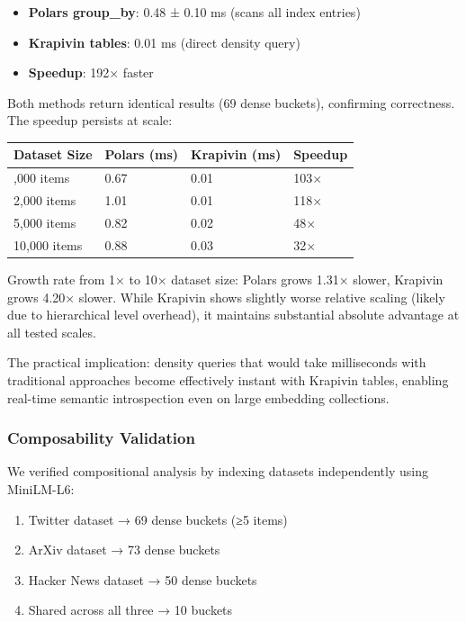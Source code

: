 \documentclass[
]{article}
\providecommand{\tightlist}{%
  \setlength{\itemsep}{0pt}\setlength{\parskip}{0pt}}
\begin{document}
\begin{itemize}
\tightlist
\item
  \textbf{Polars group\_by}: 0.48 ± 0.10 ms (scans all index entries)
\item
  \textbf{Krapivin tables}: 0.01 ms (direct density query)
\item
  \textbf{Speedup}: 192× faster
\end{itemize}

Both methods return identical results (69 dense buckets), confirming
correctness. The speedup persists at scale:

\begin{longtable}[]{@{}llll@{}}
\toprule\noalign{}
Dataset Size & Polars (ms) & Krapivin (ms) & Speedup \\
\midrule\noalign{}
\endhead
\bottomrule\noalign{}
\endlastfoot
1,000 items & 0.67 & 0.01 & 103× \\
2,000 items & 1.01 & 0.01 & 118× \\
5,000 items & 0.82 & 0.02 & 48× \\
10,000 items & 0.88 & 0.03 & 32× \\
\end{longtable}

Growth rate from 1× to 10× dataset size: Polars grows 1.31× slower,
Krapivin grows 4.20× slower. While Krapivin shows slightly worse
relative scaling (likely due to hierarchical level overhead), it
maintains substantial absolute advantage at all tested scales.

The practical implication: density queries that would take milliseconds
with traditional approaches become effectively instant with Krapivin
tables, enabling real-time semantic introspection even on large
embedding collections.

\subsubsection{Composability Validation}\label{composability-validation}

We verified compositional analysis by indexing datasets independently
using MiniLM-L6:

\begin{enumerate}
\def\labelenumi{\arabic{enumi}.}
\tightlist
\item
  Twitter dataset → 69 dense buckets (≥5 items)
\item
  ArXiv dataset → 73 dense buckets
\item
  Hacker News dataset → 50 dense buckets
\item
  Shared across all three → 10 buckets
\end{enumerate}
\end{document}
